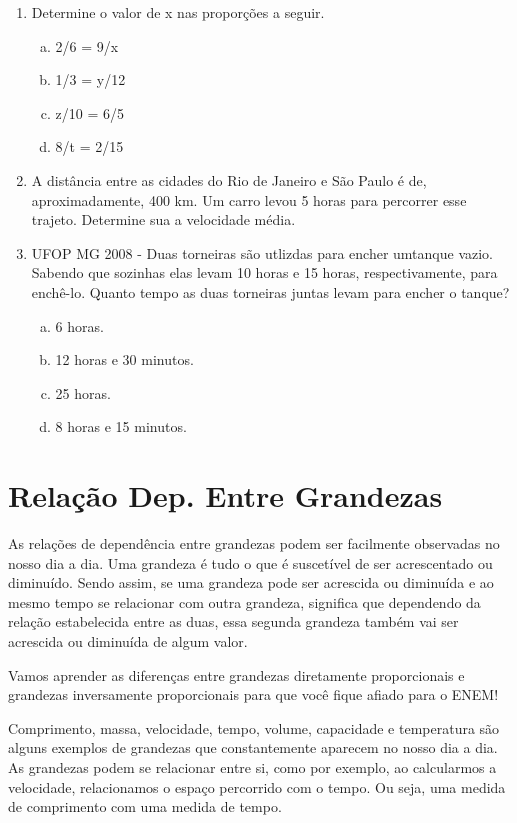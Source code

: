 \begin{multicols*}{2}
\begin{enumerate}[wide, labelwidth=!, labelindent=0pt]
		\item Determine o valor de x nas proporções a seguir.
		\begin{enumerate}[(a)]
			\item 2/6 = 9/x
			\item 1/3 = y/12
			\item z/10 = 6/5
			\item 8/t = 2/15
		\end{enumerate}

		\item A distância entre as cidades do Rio de Janeiro e São Paulo é de, aproximadamente, 400 km. Um carro levou 5 horas para percorrer esse trajeto. Determine sua a velocidade média.\\

		\item UFOP MG 2008 - Duas torneiras são utlizdas para encher umtanque vazio. Sabendo que sozinhas elas levam 10 horas e 15 horas, respectivamente, para enchê-lo. Quanto tempo as duas torneiras juntas levam para encher o tanque?
		\begin{enumerate}[(a)]
			\item 6 horas.
			\item 12 horas e 30 minutos.
			\item 25 horas.
			\item 8 horas e 15 minutos.
		\end{enumerate}

	\end{enumerate}

	\section*{Relação Dep. Entre Grandezas}

	As relações de dependência entre grandezas podem ser facilmente observadas no nosso dia a dia. Uma grandeza é tudo o que é suscetível de ser acrescentado ou diminuído. Sendo assim, se uma grandeza pode ser acrescida ou diminuída e ao mesmo tempo se relacionar com outra grandeza, significa que dependendo da relação estabelecida entre as duas, essa segunda grandeza também vai ser acrescida ou diminuída de algum valor.

	Vamos aprender as diferenças entre grandezas diretamente proporcionais e grandezas inversamente proporcionais para que você fique afiado para o ENEM!

	Comprimento, massa, velocidade, tempo, volume, capacidade e temperatura são alguns exemplos de grandezas que constantemente aparecem no nosso dia a dia. As grandezas podem se relacionar entre si,  como por exemplo, ao calcularmos a velocidade, relacionamos o espaço percorrido com o tempo. Ou seja, uma medida de comprimento com uma medida de tempo.


\end{multicols*}
